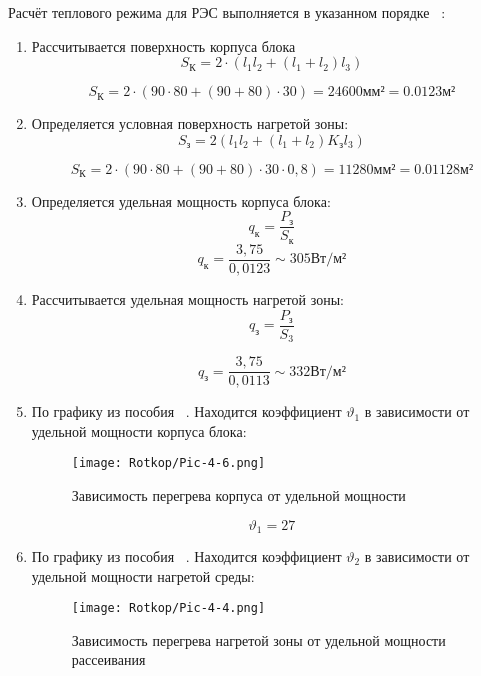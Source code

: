 Расчёт теплового режима для РЭС выполняется в указанном порядке
~\cite{Rotkop1976}:
\begin{enumerate}
\item Рассчитывается поверхность корпуса блока
  \begin{equation}
    S_{К} = 2 \cdot (l_1 l_2 + (l_1+ l_2)l_3) %
  \end{equation}

  $$S_{К} = 2 \cdot (90 \cdot 80 + (90 + 80) \cdot 30) = 24600 мм² = 0.0123 м²$$
  
\item Определяется условная поверхность нагретой зоны:
  \begin{equation}
    S_{з} = 2 (l_1 l_2 + (l_1 + l_2) K_{з} l_3 ) %
  \end{equation}

  $$S_{К} = 2 \cdot (90 \cdot 80 + (90 + 80) \cdot 30 \cdot 0,8) = 11280 мм² = 0.01128м²$$
\item Определяется удельная мощность корпуса блока:
%
\begin{equation}
  q_к = \frac{P_з}{S_к} %
\end{equation}
%
$$ q_к = \frac{3,75}{0,0123} \sim 305 Вт/м² $$

\item Рассчитывается удельная мощность нагретой зоны:
  \begin{equation}
      q_з = \frac{P_з}{S_3} %
    \end{equation}

$$ q_з = \frac{3,75}{0,0113} \sim 332 Вт/м² $$
\item По графику из пособия ~\cite{Rotkop1976}. Находится коэффициент
$\vartheta_1$ в зависимости от удельной мощности корпуса блока:
\begin{figure}[H]
  \centering
  \texttt{[image: Rotkop/Pic-4-6.png]}
  \caption{Зависимость перегрева корпуса от удельной мощности}
\end{figure}

$$\vartheta_1 = 27  $$
\item По графику из пособия ~\cite{Rotkop1976}. Находится коэффициент
$\vartheta_2$ в зависимости от удельной мощности нагретой среды:

\begin{figure}[H]
  \centering
  \texttt{[image: Rotkop/Pic-4-4.png]}
  \caption{Зависимость перегрева нагретой зоны от удельной мощности рассеивания}
\end{figure}


\end{enumerate}
